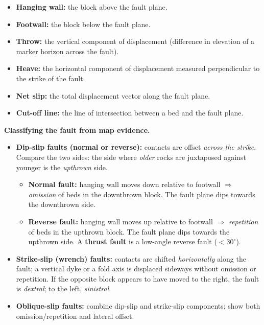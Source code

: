\documentclass[11pt]{article}
\begin{document}
\begin{definition}
\begin{itemize}
\item \textbf{Hanging wall:} the block above the fault plane.
\item \textbf{Footwall:} the block below the fault plane.
\item \textbf{Throw:} the vertical component of displacement (difference in elevation of a marker horizon across the fault).
\item \textbf{Heave:} the horizontal component of displacement measured perpendicular to the strike of the fault.
\item \textbf{Net slip:} the total displacement vector along the fault plane.
\item \textbf{Cut-off line:} the line of intersection between a bed and the fault plane.
\end{itemize}
\end{definition}

\textbf{Classifying the fault from map evidence.}\par
\begin{itemize}
\item \textbf{Dip-slip faults (normal or reverse):} contacts are offset \emph{across the strike}. Compare the two sides: the side where \emph{older} rocks are juxtaposed against younger is the \emph{upthrown} side. 
  \begin{itemize}
  \item \textbf{Normal fault:} hanging wall moves down relative to footwall $\Rightarrow$ \emph{omission} of beds in the downthrown block. The fault plane dips towards the downthrown side.
  \item \textbf{Reverse fault:} hanging wall moves up relative to footwall $\Rightarrow$ \emph{repetition} of beds in the upthrown block. The fault plane dips towards the upthrown side. A \textbf{thrust fault} is a low-angle reverse fault ($< 30^\circ$).
  \end{itemize}
\item \textbf{Strike-slip (wrench) faults:} contacts are shifted \emph{horizontally} along the fault; a vertical dyke or a fold axis is displaced sideways without omission or repetition. If the opposite block appears to have moved to the right, the fault is \emph{dextral}; to the left, \emph{sinistral}.
\item \textbf{Oblique-slip faults:} combine dip-slip and strike-slip components; show both omission/repetition and lateral offset.
\end{itemize}
\end{document}
